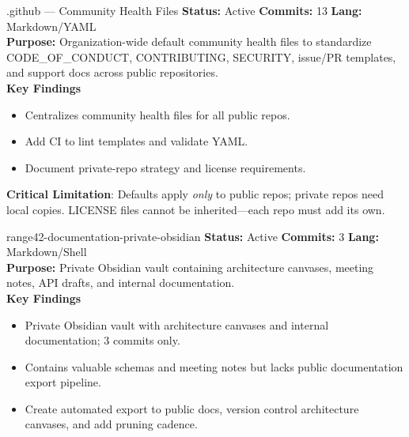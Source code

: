 \documentclass[aspectratio=169]{beamer}
\begin{document}
\begin{frame}{.github — Community Health Files \; \faUsers}
  \textbf{Status:} Active \hfill \textbf{Commits:} 13 \hfill \textbf{Lang:} Markdown/YAML\\[2mm]
  \textbf{Purpose:} Organization-wide default community health files to standardize CODE\_OF\_CONDUCT, CONTRIBUTING, SECURITY, issue/PR templates, and support docs across public repositories.\\[2mm]
  \textbf{Key Findings}
  \begin{itemize}
    \item Centralizes community health files for all public repos.
    \item Add CI to lint templates and validate YAML.
    \item Document private-repo strategy and license requirements.
  \end{itemize}
  \begin{tcolorbox}
    \faExclamationTriangle\; \textbf{Critical Limitation}: Defaults apply \emph{only} to public repos; private repos need local copies. LICENSE files cannot be inherited—each repo must add its own.
  \end{tcolorbox}
\end{frame}

\begin{frame}{range42-documentation-private-obsidian \; \faBook}
  \textbf{Status:} Active \hfill \textbf{Commits:} 3 \hfill \textbf{Lang:} Markdown/Shell\\[2mm]
  \textbf{Purpose:} Private Obsidian vault containing architecture canvases, meeting notes, API drafts, and internal documentation.\\[2mm]
  \textbf{Key Findings}
  \begin{itemize}
    \item Private Obsidian vault with architecture canvases and internal documentation; 3 commits only.
    \item Contains valuable schemas and meeting notes but lacks public documentation export pipeline.
    \item Create automated export to public docs, version control architecture canvases, and add pruning cadence.
  \end{itemize}
\end{frame}
\end{document}
